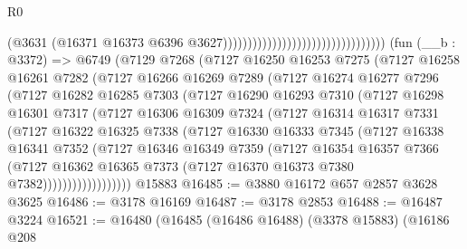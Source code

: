 \begin{lexlean}{R0}
\begin{coremodule}
                                                                  (@3631
                                                                    (@16371
                                                                      @16373
                                                                      @6396
                                                                      @3627)))))))))))))))))))))))))))))))))
    (fun (__b : @3372) =>
    @6749
      (@7129
        @7268
        (@7127
          @16250
          @16253
          @7275
          (@7127
            @16258
            @16261
            @7282
            (@7127
              @16266
              @16269
              @7289
              (@7127
                @16274
                @16277
                @7296
                (@7127
                  @16282
                  @16285
                  @7303
                  (@7127
                    @16290
                    @16293
                    @7310
                    (@7127
                      @16298
                      @16301
                      @7317
                      (@7127
                        @16306
                        @16309
                        @7324
                        (@7127
                          @16314
                          @16317
                          @7331
                          (@7127
                            @16322
                            @16325
                            @7338
                            (@7127
                              @16330
                              @16333
                              @7345
                              (@7127
                                @16338
                                @16341
                                @7352
                                (@7127
                                  @16346
                                  @16349
                                  @7359
                                  (@7127
                                    @16354
                                    @16357
                                    @7366
                                    (@7127
                                      @16362
                                      @16365
                                      @7373
                                      (@7127 @16370 @16373 @7380 @7382))))))))))))))))))
    @15883
@16485 := @3880 @16172 @657 @2857 @3628 @3625
@16486 := @3178 @16169
@16487 := @3178 @2853
@16488 := @16487 @3224
@16521 := @16480
    (@16485
      (@16486 @16488)
      (@3378 @15883)
      (@16186
        @208

\end{coremodule}
\end{lexlean}
